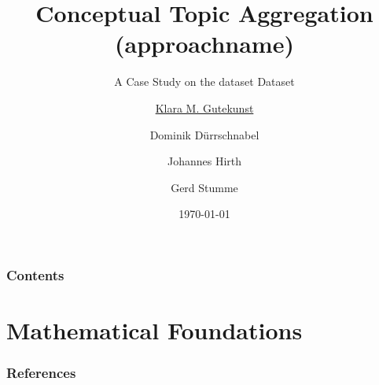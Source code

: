 \documentclass[10pt]{beamer}
\title[\university{}]{Conceptual Topic Aggregation (\acs{approachname})}
\subtitle{A Case Study on the \acs{dataset} Dataset}
\author[Klara M. Gutekunst]{\underline{Klara M. Gutekunst} \and Dominik Dürrschnabel \and Johannes Hirth \and Gerd Stumme}
\institute[klara.gutekunst@uni-kassel.de]{\university{}}
\date[\today]
{\today}
\begin{document}

\frame{\titlepage}
\begin{frame}
\frametitle{Contents}
\tableofcontents
\end{frame}




\section{Mathematical Foundations}













\begin{frame}[allowframebreaks]
\frametitle{References}
\printbibliography
\end{frame}



\end{document}
